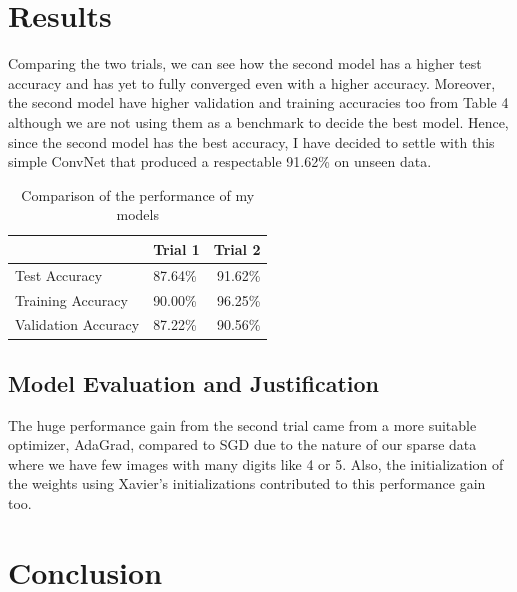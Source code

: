 \documentclass[twoside, column]{article}
\begin{document}
\section{Results}
 
 Comparing the two trials, we can see how the second model has a higher test accuracy and has yet to fully converged even with a higher accuracy. Moreover, the second model have higher validation and training accuracies too from Table 4 although we are not using them as a benchmark to decide the best model. Hence, since the second model has the best accuracy, I have decided to settle with this simple ConvNet that produced a respectable 91.62\% on unseen data.
 
 \begin{table}[htp]
\caption{Comparison of the performance of my models}
\begin{center}
\begin{tabular}{llr}

\cmidrule(r){1-3}
& Trial 1 & Trial 2 \\
\midrule
Test Accuracy  & 87.64\% & 91.62\%\\
Training Accuracy & 90.00\% & 96.25\% \\
Validation Accuracy &  87.22\% & 90.56\% \\

\end{tabular}
\end{center}
\label{default}
\end{table}
 
\subsection{Model Evaluation and Justification}
The huge performance gain from the second trial came from a more suitable optimizer, AdaGrad, compared to SGD due to the nature of our sparse data where we have few images with many digits like 4 or 5. Also, the initialization of the weights using Xavier's initializations contributed to this performance gain too. 



\section{Conclusion}
\end{document}
